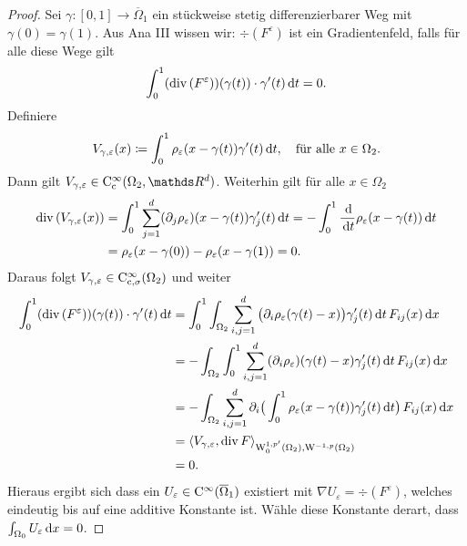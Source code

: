 \begin{proof}
  Sei $\gamma \colon [0,1] \to \overline\Omega_1$ ein stückweise stetig differenzierbarer Weg mit $\gamma(0) = \gamma(1)$.
  Aus Ana III wissen wir: $\div(F^\varepsilon)$ ist ein Gradientenfeld, falls für alle diese Wege gilt
  $$
  \int_0^1 (\mathrm{div\,} (F^\varepsilon))(\gamma(t))\cdot \gamma'(t) \, {\operatorname{d}\!{t}} = 0.
  $$
  Definiere 
  $$
  V_{\gamma,\varepsilon}(x) \coloneqq \int_0^1 \rho_\varepsilon(x - \gamma(t))\gamma'(t) \, {\operatorname{d}\!{t}}, \quad\text{für alle } x \in \Omega_2.
  $$
  Dann gilt $V_{\gamma,\varepsilon} \in \CC_{\cc}^\infty(\Omega_2, \R^d)$.
  Weiterhin gilt für alle $x \in \Omega_2$
  \begin{align*}
    \mathrm{div\,} (V_{\gamma,\varepsilon}(x))
    &= \int_0^1 \sum_{j = 1}^d (\partial_j \rho_\varepsilon)(x - \gamma(t)) \gamma_j'(t) \, {\operatorname{d}\!{t}}
    = - \int_0^1 \frac{\, {\operatorname{d}\!{}} }{\, {\operatorname{d}\!{t}}} \rho_\varepsilon(x - \gamma(t)) \, {\operatorname{d}\!{t}} \\
    &= \rho_\varepsilon(x - \gamma(0)) - \rho_\varepsilon(x - \gamma(1))
    = 0.
  \end{align*}
  Daraus folgt $V_{\gamma,\varepsilon} \in \mathrm{C}_{\mathrm{c}, \sigma}^\infty(\Omega_2)$ und weiter
  \begin{align*}
    \int_0^1(\mathrm{div\,} (F^\varepsilon))(\gamma(t)) \cdot \gamma'(t) \, {\operatorname{d}\!{t}}
    &= \int_0^1 \int_{\Omega_2} \sum_{i,j = 1}^d \big(\partial_i \rho_\varepsilon(\gamma(t) - x)\big) \gamma_j'(t) \, {\operatorname{d}\!{t}} \, F_{ij}(x)  \, {\operatorname{d}\!{x}} \\
    &= -\int_{\Omega_2} \int_0^1 \sum_{i,j = 1}^d (\partial_i \rho_\varepsilon) (\gamma(t) - x) \gamma_j'(t) \, {\operatorname{d}\!{t}} \, F_{ij}(x) \, {\operatorname{d}\!{x}} \\
    &= -\int_{\Omega_2} \sum_{i,j=1}^d \partial_i\big(  \int_0^1 \rho_\varepsilon(x - \gamma(t)) \gamma_j'(t) \, {\operatorname{d}\!{t}} \big) \, F_{ij}(x) \, {\operatorname{d}\!{x}} \\
    &= \langle V_{\gamma,\varepsilon}, \mathrm{div\,} F \rangle_{\mathrm{W}_0^{1,p'}(\Omega_2), \mathrm{W}^{-1,p}(\Omega_2)} \\
    &= 0.
  \end{align*}
  Hieraus ergibt sich dass ein $U_\varepsilon \in \mathrm{C}^\infty(\overline\Omega_1)$ existiert mit $\nabla U_\varepsilon = \div(F^\varepsilon)$, welches eindeutig bis auf eine additive Konstante ist.
  Wähle diese Konstante derart, dass $\int_{\Omega_0} U_\varepsilon \, {\operatorname{d}\!{x}} = 0$.


\end{proof}
